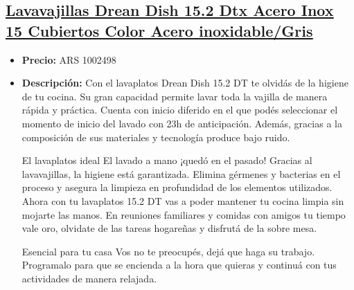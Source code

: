 \documentclass{article}
\begin{document}
\begin{adjustwidth}{2em}{}
\subsection{\uline{\href{https://www.mercadolibre.com.ar/lavavajillas-drean-dish-152-dtx-acero-inox-15-cubiertos-color-acero-inoxidablegris/p/MLA12187952}{Lavavajillas Drean Dish 15.2 Dtx Acero Inox 15 Cubiertos Color Acero inoxidable/Gris}}}
\begin{itemize}
    \item \textbf{Precio:} ARS 1002498
    \item \textbf{Descripción:} Con el lavaplatos Drean Dish 15.2 DT te olvidás de la higiene de tu cocina. Su gran capacidad permite lavar toda la vajilla de manera rápida y práctica. Cuenta con inicio diferido en el que podés seleccionar el momento de inicio del lavado con 23h de anticipación. Además, gracias a la composición de sus materiales y tecnología produce bajo ruido.

El lavaplatos ideal
El lavado a mano ¡quedó en el pasado! Gracias al lavavajillas,  la higiene está garantizada. Elimina gérmenes y bacterias en el proceso y asegura la limpieza en profundidad de los elementos utilizados. Ahora con tu lavaplatos 15.2 DT vas a poder mantener tu cocina limpia sin mojarte las manos. En reuniones familiares y comidas con amigos tu tiempo vale oro, olvidate de las tareas hogareñas y disfrutá de la sobre mesa.

Esencial para tu casa
Vos no te preocupés, dejá que haga su trabajo. Programalo para que se encienda a la hora que quieras y continuá con tus actividades de manera relajada.


\end{itemize}
\end{adjustwidth}
\end{document}
